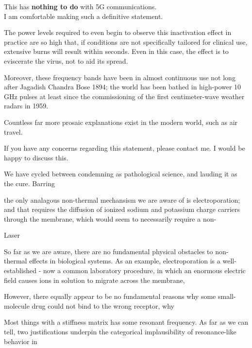 \documentclass[paper.tex]{subfiles}
\begin{document}
\begin{autem}

{\Large {This has \textbf{nothing to do} with 5G communications.}}\\

I am comfortable making such a definitive statement.

The power levels required to even begin to observe this inactivation effect in practice are so high that, if conditions are not specifically tailored for clinical use, extensive burns will result within seconds. Even in this case, the effect is to eviscerate the virus, not to aid its spread. 

Moreover, these frequency bands have been in almost continuous use not long after Jagadish Chandra Bose 1894; the world has been bathed in high-power 10 GHz pulses at least since the commissioning of the first centimeter-wave weather radars in 1959. 

Countless far more prosaic explanations exist in the modern world, such as air travel.

If you have any concerns regarding this statement, please contact me. I would be happy to discuss this.

\end{autem}



We have cycled between condemning as pathological science, and lauding it as the cure. Barring 





the only analagous non-thermal mechansism we are aware of is electroporation; and that requires the diffusion of ionized sodium and potassium charge carriers through the membrane, which would seem to necessarily require a non-

Laser



So far as we are aware, there are no fundamental physical obstacles to non-thermal effects in biological systems. As an example, electroporation is a well-established - now a common laboratory procedure, in which an enormous electric field causes ions in solution to migrate across the membrane, 

However, there equally appear to be no fundamental reasons why some small-molecule drug could not bind to the wrong receptor, why 



Most things with a stiffness matrix has some resonant frequency\citationneeded. As far as we can tell, two justifications underpin the categorical implausibility of resonance-like behavior in 
\end{document}
